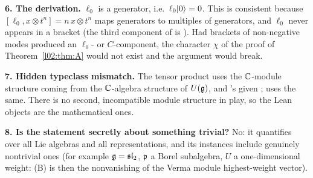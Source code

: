 \begin{warning}
\textbf{6. The derivation.} $\ell_0$ is a generator, i.e.\ $\ell_0|0\rangle=0$. This is consistent
because $[\ell_0, x\otimes t^n] = n\,x\otimes t^n$ maps generators to multiples of generators, and $\ell_0$
never appears in a bracket (the third component of  is ). Had brackets of
non-negative modes produced an $\ell_0$- or $C$-component, the character $\chi$ of the proof of
Theorem~\ref{l02:thm:A} would not exist and the argument would break.

\textbf{7. Hidden typeclass mismatch.} The tensor product 
uses the ${\mathbb{C}}$-module structure coming from the ${\mathbb{C}}$-algebra structure of $U(\mathfrak{g})$, and 's given
\lean{[Module ℂ U]};  uses the same. There is no second, incompatible module
structure in play, so the Lean objects are the mathematical ones.

\textbf{8. Is the statement secretly about something trivial?} No: it quantifies over all Lie
algebras and all representations, and its instances include genuinely nontrivial ones (for example
$\mathfrak{g} = \mathfrak{sl}_2$, $\mathfrak{p}$ a Borel subalgebra, $U$ a one-dimensional weight: (B) is then the
nonvanishing of the Verma module highest-weight vector).
\end{warning}

